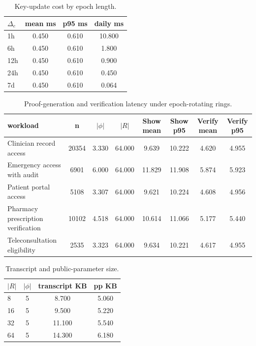 \begin{table}[htbp]
\centering
\caption{Key-update cost by epoch length.}
\label{tab:key-update}
\begin{tabular}{@{}lccc@{}}
\toprule
$\Delta_e$ & mean ms & p95 ms & daily ms \\
\midrule
1h & 0.450 & 0.610 & 10.800 \\
6h & 0.450 & 0.610 & 1.800 \\
12h & 0.450 & 0.610 & 0.900 \\
24h & 0.450 & 0.610 & 0.450 \\
7d & 0.450 & 0.610 & 0.064 \\
\bottomrule
\end{tabular}
\end{table}


\begin{table}[htbp]
\centering
\caption{Proof-generation and verification latency under epoch-rotating rings.}
\label{tab:proof-verify}
\begin{tabular}{@{}lccccccc@{}}
\toprule
workload & n & $|\phi|$ & $|R|$ & Show mean & Show p95 & Verify mean & Verify p95 \\
\midrule
Clinician record access & 20354 & 3.330 & 64.000 & 9.639 & 10.222 & 4.620 & 4.955 \\
Emergency access with audit & 6901 & 6.000 & 64.000 & 11.829 & 11.908 & 5.874 & 5.923 \\
Patient portal access & 5108 & 3.307 & 64.000 & 9.621 & 10.224 & 4.608 & 4.956 \\
Pharmacy prescription verification & 10102 & 4.518 & 64.000 & 10.614 & 11.066 & 5.177 & 5.440 \\
Teleconsultation eligibility & 2535 & 3.323 & 64.000 & 9.634 & 10.221 & 4.617 & 4.955 \\
\bottomrule
\end{tabular}
\end{table}


\begin{table}[htbp]
\centering
\caption{Transcript and public-parameter size.}
\label{tab:size}
\begin{tabular}{@{}lccc@{}}
\toprule
$|R|$ & $|\phi|$ & transcript KB & pp KB \\
\midrule
8 & 5 & 8.700 & 5.060 \\
16 & 5 & 9.500 & 5.220 \\
32 & 5 & 11.100 & 5.540 \\
64 & 5 & 14.300 & 6.180 \\
\bottomrule
\end{tabular}
\end{table}


